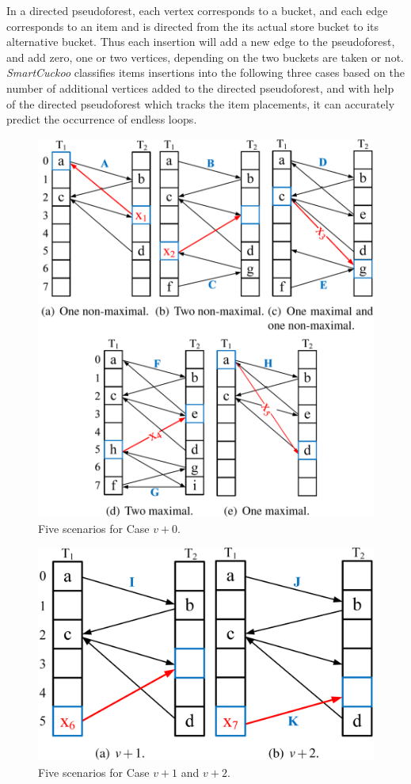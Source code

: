 \documentclass[12pt,conference,compsoc]{IEEEtran}
\begin{document}
In a directed pseudoforest, each vertex corresponds to a bucket, and each edge corresponds to an item and is directed from the its actual store bucket to its alternative bucket. Thus each insertion will add a new edge to the pseudoforest, and add zero, one or two vertices, depending on the two buckets are taken or not.  \textit{SmartCuckoo} classifies items insertions into the following three cases based on the number of additional vertices added to the directed pseudoforest, and with help of the directed pseudoforest which tracks the item placements, it can accurately predict the occurrence of endless loops.

\begin{figure}
    \centering
    \includegraphics[width=\linewidth]{v+0.png}
    \caption{Five scenarios for Case $v+0$.} \label{fig:v+0}
\end{figure}

\begin{figure}
    \centering
    \includegraphics[width=0.7
    \linewidth]{v+1-2.png}
    \caption{Five scenarios for Case $v+1$ and $v+2$.} \label{fig:v+1-2}
\end{figure}
\end{document}
